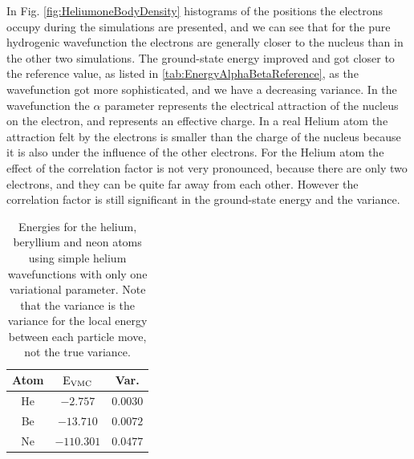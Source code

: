 			In Fig. \ref{fig:HeliumoneBodyDensity}
                        histograms of the positions the electrons
                        occupy during the simulations are presented,
                        and we can see that for the pure hydrogenic
                        wavefunction the electrons are generally
                        closer to the nucleus than in the other two
                        simulations. The ground-state energy improved
                        and got closer to the reference value, as
                        listed in \ref{tab:EnergyAlphaBetaReference},
                        as the wavefunction got more sophisticated,
                        and we have a decreasing variance. In the
                        wavefunction the $\alpha$ parameter represents
                        the electrical attraction of the nucleus on
                        the electron, and represents an effective charge.
In a real Helium atom the
                        attraction felt by the electrons is smaller
                        than the charge of the nucleus because it is
                        also under the influence of the other
                        electrons. For the Helium atom the effect of
                        the correlation factor is not very pronounced,
                        because there are only two electrons, and they
                        can be quite far away from each other. However
                        the correlation factor is still significant in
                        the ground-state energy and the variance.

			\begin{table}
			\center %
			\begin{tabular}{c|cc}
				Atom & $\mbox{E}_{\mbox{\scriptsize{VMC}}}$ &Var. \tabularnewline
				\hline 
				He &  $-2.757$ & $0.0030$ \tabularnewline
				Be &  $-13.710$ & $0.0072$ \tabularnewline
				Ne &  $-110.301$ & $0.0477$ \tabularnewline

			\end{tabular}%
			\protect\caption{ Energies for the helium, beryllium and neon atoms using simple helium wavefunctions with only one variational parameter. Note that the variance is the variance for the local energy between each particle move, not the true variance.}
			\label{tab:helium_wavefunctions_tests} 
			\end{table}

